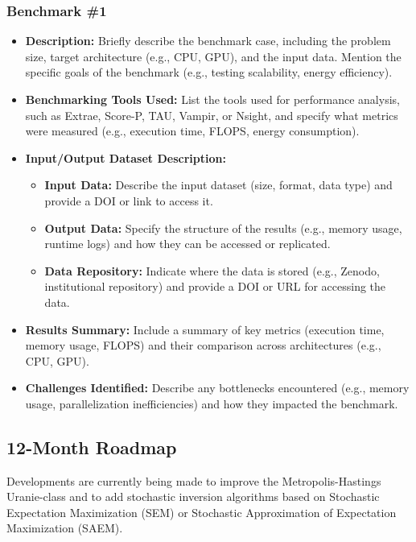 \subsubsection{Benchmark \#1}
\begin{itemize}
    \item \textbf{Description:} Briefly describe the benchmark case, including the problem size, target architecture (e.g., CPU, GPU), and the input data. Mention the specific goals of the benchmark (e.g., testing scalability, energy efficiency).
    \item \textbf{Benchmarking Tools Used:} List the tools used for performance analysis, such as Extrae, Score-P, TAU, Vampir, or Nsight, and specify what metrics were measured (e.g., execution time, FLOPS, energy consumption).
    \item \textbf{Input/Output Dataset Description:}
        \begin{itemize}
            \item \textbf{Input Data:} Describe the input dataset (size, format, data type) and provide a DOI or link to access it.
            \item \textbf{Output Data:} Specify the structure of the results (e.g., memory usage, runtime logs) and how they can be accessed or replicated.
            \item \textbf{Data Repository:} Indicate where the data is stored (e.g., Zenodo, institutional repository) and provide a DOI or URL for accessing the data.
        \end{itemize}
    \item \textbf{Results Summary:} Include a summary of key metrics (execution time, memory usage, FLOPS) and their comparison across architectures (e.g., CPU, GPU).
    \item \textbf{Challenges Identified:} Describe any bottlenecks encountered (e.g., memory usage, parallelization inefficiencies) and how they impacted the benchmark.
\end{itemize}

\subsection{12-Month Roadmap}
\label{sec:WP5:Uranie:roadmap}

Developments are currently being made to improve the Metropolis-Hastings Uranie-class and to add stochastic inversion algorithms based on Stochastic Expectation Maximization (SEM) or Stochastic Approximation of Expectation Maximization (SAEM). 

